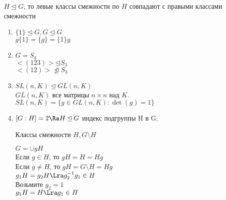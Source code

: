 \begin{conseq}
$H \unlhd G$, то левые классы смежности по $H$ совпадают с правыми классами смежности
\end{conseq}
\begin{exmp}  
\begin{enumerate}
    \item $\{1\} \unlhd G, G \unlhd G$ \\
    $g\{1\} = \{g\} = \{1\}g$\\
    \item $G = S_3$\\
    $<(123)> \unlhd S_3$\\
    $<(12)> \ntrianglelefteq S_3$\\
    \item $SL(n, K) \unlhd GL(n, K)$\\
    $GL(n, K)$ все матрицы $n \times n$ над $K$.
    $SL(n, K) = \{g \in GL(n, K)\colon\det(g) = 1\}$
    \item 
    $[G:H] = 2 \Ra H \unlhd G$
    индекс подгруппы H в G.

    Классы смежности $H, G \setminus H$

    $G = \cup gH$\\
    Если $g \in H$, то $gH = H = Hg$\\
    Если $g \ne H$, то $gH = G\setminus H = Hg$\\

    $g_1H = g_2H \Lra g_2^{-1}g_1 \in H$ \\
    Возьмите $g_2 = 1$\\
    $g_1H = H \Lra g_1 \in H$\\
\end{enumerate}
\end{exmp}

